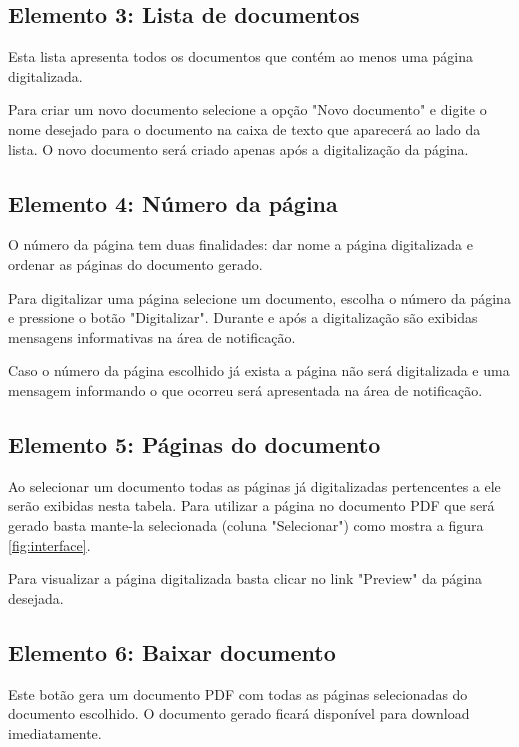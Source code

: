 \subsection{Elemento 3: Lista de documentos}
Esta lista apresenta todos os documentos que contém ao menos
uma página digitalizada. 

Para criar um novo documento selecione a opção "Novo documento"
e digite o nome desejado para o documento na caixa de texto
que aparecerá ao lado da lista. O novo documento será criado
apenas após a digitalização da página. 

\subsection{Elemento 4: Número da página}
O número da página tem duas finalidades: dar nome a página digitalizada e
ordenar as páginas do documento gerado.

Para digitalizar uma página selecione um documento, escolha o número da 
página e pressione o botão "Digitalizar". Durante e após a digitalização
são exibidas mensagens informativas na área de notificação.

Caso o número da página escolhido já exista a página não será digitalizada
e uma mensagem informando o que ocorreu será apresentada na área de 
notificação.

\subsection{Elemento 5: Páginas do documento}
Ao selecionar um documento todas as páginas já digitalizadas pertencentes a
ele serão exibidas nesta tabela. Para utilizar a página no documento PDF que
será gerado basta mante-la selecionada (coluna "Selecionar") como mostra a 
figura \ref{fig:interface}.

Para visualizar a página digitalizada basta clicar no link "Preview" da página
desejada.

\subsection{Elemento 6: Baixar documento}
Este botão gera um documento PDF com todas as páginas selecionadas do 
documento escolhido. O documento gerado ficará disponível para download 
imediatamente.





